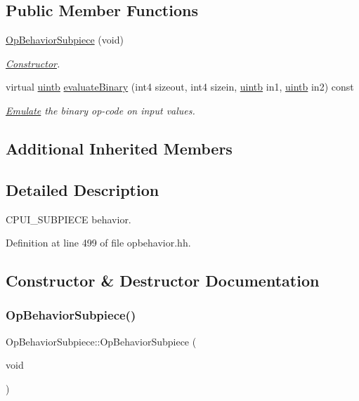 \subsection*{Public Member Functions}
\begin{DoxyCompactItemize}
\item 
\mbox{\hyperlink{class_op_behavior_subpiece_a3637a424fabf1d32ec08fe361761074a}{Op\+Behavior\+Subpiece}} (void)
\begin{DoxyCompactList}\small\item\em \mbox{\hyperlink{class_constructor}{Constructor}}. \end{DoxyCompactList}\item 
virtual \mbox{\hyperlink{types_8h_a2db313c5d32a12b01d26ac9b3bca178f}{uintb}} \mbox{\hyperlink{class_op_behavior_subpiece_a9935f52a58aeef8b4911c35388b91c3f}{evaluate\+Binary}} (int4 sizeout, int4 sizein, \mbox{\hyperlink{types_8h_a2db313c5d32a12b01d26ac9b3bca178f}{uintb}} in1, \mbox{\hyperlink{types_8h_a2db313c5d32a12b01d26ac9b3bca178f}{uintb}} in2) const
\begin{DoxyCompactList}\small\item\em \mbox{\hyperlink{class_emulate}{Emulate}} the binary op-\/code on input values. \end{DoxyCompactList}\end{DoxyCompactItemize}
\subsection*{Additional Inherited Members}


\subsection{Detailed Description}
C\+P\+U\+I\+\_\+\+S\+U\+B\+P\+I\+E\+CE behavior. 

Definition at line 499 of file opbehavior.\+hh.



\subsection{Constructor \& Destructor Documentation}
\mbox{\label{class_op_behavior_subpiece_a3637a424fabf1d32ec08fe361761074a}} 
\subsubsection{\texorpdfstring{OpBehaviorSubpiece()}{OpBehaviorSubpiece()}}
{\footnotesize\ttfamily Op\+Behavior\+Subpiece\+::\+Op\+Behavior\+Subpiece (\begin{DoxyParamCaption}\item[{void}]{ }\end{DoxyParamCaption})\hspace{0.3cm}{\ttfamily [inline]}}



